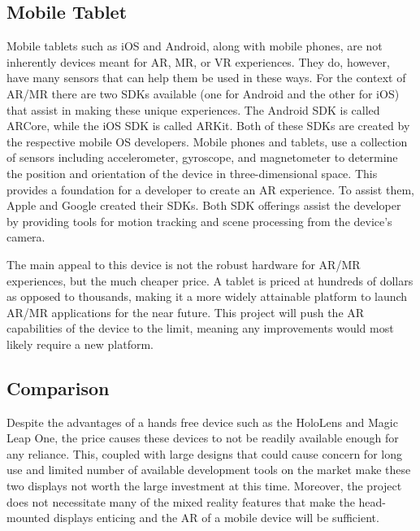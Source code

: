 \documentclass[10pt,draftclsnofoot,onecolumn,letterpaper]{IEEEtran}
\begin{document}
\subsection{Mobile Tablet}
Mobile tablets such as iOS and Android, along with mobile phones, are not inherently devices meant for AR, MR, or VR experiences. They do, however, have many sensors that can help them be used in these ways. For the context of AR/MR there are two SDKs available (one for Android and the other for iOS) that assist in making these unique experiences. The Android SDK is called ARCore, while the iOS SDK is called ARKit. Both of these SDKs are created by the respective mobile OS developers. Mobile phones and tablets, use a collection of sensors including accelerometer, gyroscope, and magnetometer to determine the position and orientation of the device in three-dimensional space\cite{PhoneSense}. This provides a foundation for a developer to create an AR experience. To assist them, Apple and Google created their SDKs. Both SDK offerings assist the developer by providing tools for motion tracking and scene processing from the device's camera\cite{ARKdoc}\cite{ARCdoc}.\par
The main appeal to this device is not the robust hardware for AR/MR experiences, but the much cheaper price. A tablet is priced at hundreds of dollars as opposed to thousands, making it a more widely attainable platform to launch AR/MR applications for the near future. This project will push the AR capabilities of the device to the limit, meaning any improvements would most likely require a new platform.\par

\subsection{Comparison}

Despite the advantages of a hands free device such as the HoloLens and Magic Leap One, the price causes these devices to not be readily available enough for any reliance. This, coupled with large designs that could cause concern for long use and limited number of available development tools on the market make these two displays not worth the large investment at this time. Moreover, the project does not necessitate many of the mixed reality features that make the head-mounted displays enticing and the AR of a mobile device will be sufficient.\par
\end{document}

